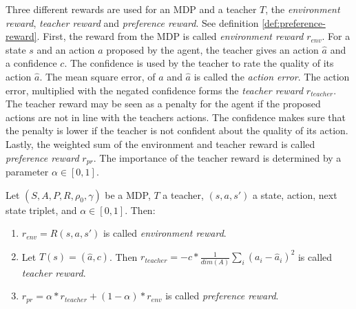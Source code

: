 Three different rewards are used for an MDP and a teacher $T$, the \emph{environment reward}, \emph{teacher reward} and \emph{preference reward}. See definition \ref{def:preference-reward}. First, the reward from the MDP is called \emph{environment reward} $r_{env}$. For a state $s$ and an action $a$ proposed by the agent, the teacher gives an action $\hat{a}$ and a confidence $c$. The confidence is used by the teacher to rate the quality of its action $\hat{a}$. The mean square error, of $a$ and $\hat{a}$ is called the \emph{action error}. The action error, multiplied with the negated confidence forms the \emph{teacher reward} $r_{teacher}$. The teacher reward may be seen as a penalty for the agent if the proposed actions are not in line with the teachers actions. The confidence makes sure that the penalty is lower if the teacher is not confident about the quality of its action. Lastly, the weighted sum of the environment and teacher reward is called \emph{preference reward} $r_{pr}$. The importance of the teacher reward is determined by a parameter $\alpha \in [0,1]$.
\begin{definition}
    \label{def:preference-reward}
    Let $(S, A, P, R, \rho_0, \gamma)$ be a MDP, $T$ a teacher, $(s, a, s')$ a state, action, next state triplet, and $\alpha \in [0,1]$. Then:
    \begin{enumerate}[(1)]
        \item\label{enm:pr:external-reward} $r_{env} = R(s, a, s')$ is called \emph{environment reward}.
        \item\label{enm:pr:internal-reward} Let $T(s) = (\hat{a}, c)$. Then $r_{teacher} = -c * \frac{1}{dim(A)} \sum_i (a_i - \hat{a}_i)^2$ is called \emph{teacher reward}.
        \item\label{enm:pr:preference-reward} $r_{pr} = \alpha * r_{teacher} + (1-\alpha) * r_{env}$ is called \emph{preference reward}.
    \end{enumerate}
\end{definition}

